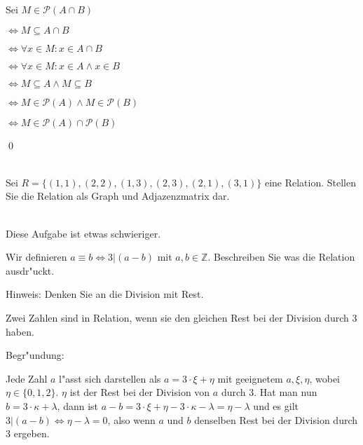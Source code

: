 \begin{loesung}
Sei $M\in\mathscr{P}(A\cap B)$

$\Leftrightarrow M\subseteq A\cap B$

$\Leftrightarrow \forall x\in M:x\in A\cap B$

$\Leftrightarrow \forall x\in M: x\in A\wedge x\in B$

$\Leftrightarrow M\subseteq A\wedge M\subseteq B$

$\Leftrightarrow M\in\mathscr{P}(A)\wedge M\in\mathscr{P}(B)$

$\Leftrightarrow M\in\mathscr{P}(A)\cap\mathscr{P}(B)$

\qed
\end{loesung}

\\
Sei $R=\{(1,1),(2,2),(1,3),(2,3),(2,1),(3,1)\}$ eine Relation. Stellen Sie die Relation als Graph und Adjazenzmatrix dar.

\\
Diese Aufgabe ist etwas schwieriger.

Wir definieren $a\equiv b\Leftrightarrow 3|(a-b)$ mit $a,b\in\mathbb{Z}$. Beschreiben Sie was die Relation ausdr"uckt.

\begin{notes}
Hinweis: Denken Sie an die Division mit Rest.
\end{notes}

\begin{loesung}
 Zwei Zahlen sind in Relation, wenn sie den gleichen Rest bei der Division durch $3$ haben. 
 
 Begr"undung:

 Jede Zahl $a$ l"asst sich darstellen als $a=3\cdot \xi+\eta$ mit geeignetem $a,\xi,\eta$, wobei $\eta\in\{0,1,2\}$.
 $\eta$ ist der Rest bei der Division von $a$ durch $3$. Hat man nun $b=3\cdot\kappa+\lambda$, dann ist 
 $a-b=3\cdot\xi+\eta-3\cdot\kappa-\lambda=\eta-\lambda$ und es gilt $3|(a-b)\Leftrightarrow \eta-\lambda=0$, also wenn $a$ und $b$ denselben Rest bei der Division durch $3$ ergeben.
\end{loesung}

